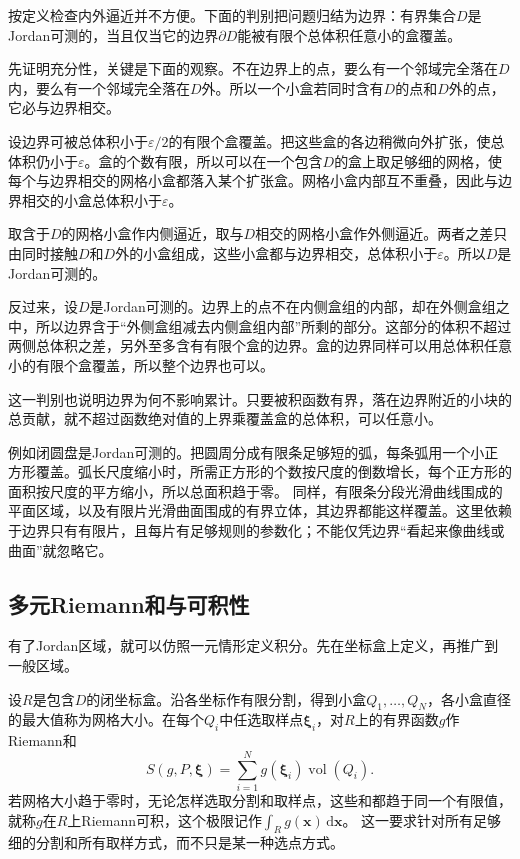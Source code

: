 按定义检查内外逼近并不方便。下面的判别把问题归结为边界：有界集合$D$是Jordan可测的，当且仅当它的边界$\partial D$能被有限个总体积任意小的盒覆盖。

先证明充分性，关键是下面的观察。不在边界上的点，要么有一个邻域完全落在$D$内，要么有一个邻域完全落在$D$外。所以一个小盒若同时含有$D$的点和$D$外的点，它必与边界相交。

设边界可被总体积小于$\varepsilon/2$的有限个盒覆盖。把这些盒的各边稍微向外扩张，使总体积仍小于$\varepsilon$。盒的个数有限，所以可以在一个包含$D$的盒上取足够细的网格，使每个与边界相交的网格小盒都落入某个扩张盒。网格小盒内部互不重叠，因此与边界相交的小盒总体积小于$\varepsilon$。

取含于$D$的网格小盒作内侧逼近，取与$D$相交的网格小盒作外侧逼近。两者之差只由同时接触$D$和$D$外的小盒组成，这些小盒都与边界相交，总体积小于$\varepsilon$。所以$D$是Jordan可测的。

反过来，设$D$是Jordan可测的。边界上的点不在内侧盒组的内部，却在外侧盒组之中，所以边界含于“外侧盒组减去内侧盒组内部”所剩的部分。这部分的体积不超过两侧总体积之差，另外至多含有有限个盒的边界。盒的边界同样可以用总体积任意小的有限个盒覆盖，所以整个边界也可以。

这一判别也说明边界为何不影响累计。只要被积函数有界，落在边界附近的小块的总贡献，就不超过函数绝对值的上界乘覆盖盒的总体积，可以任意小。

例如闭圆盘是Jordan可测的。把圆周分成有限条足够短的弧，每条弧用一个小正方形覆盖。弧长尺度缩小时，所需正方形的个数按尺度的倒数增长，每个正方形的面积按尺度的平方缩小，所以总面积趋于零。
同样，有限条分段光滑曲线围成的平面区域，以及有限片光滑曲面围成的有界立体，其边界都能这样覆盖。这里依赖于边界只有有限片，且每片有足够规则的参数化；不能仅凭边界“看起来像曲线或曲面”就忽略它。

\subsection{多元Riemann和与可积性}

有了Jordan区域，就可以仿照一元情形定义积分。先在坐标盒上定义，再推广到一般区域。

设$R$是包含$D$的闭坐标盒。沿各坐标作有限分割，得到小盒$Q_1,\ldots,Q_N$，各小盒直径的最大值称为网格大小。在每个$Q_i$中任选取样点$\bm\xi_i$，对$R$上的有界函数$g$作Riemann和
\[
 S(g,P,\bm\xi)=\sum_{i=1}^N g(\bm\xi_i)\operatorname{vol}(Q_i).
\]
若网格大小趋于零时，无论怎样选取分割和取样点，这些和都趋于同一个有限值，就称$g$在$R$上Riemann可积，这个极限记作$\int_R g(\bm x)\,\mathrm d\bm x$。
这一要求针对所有足够细的分割和所有取样方式，而不只是某一种选点方式。

